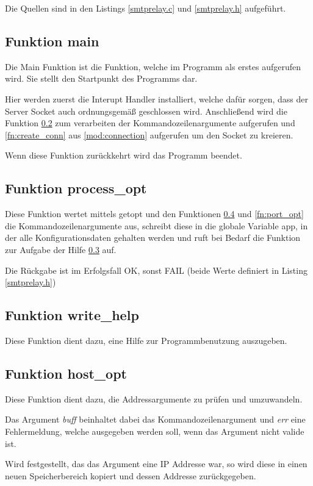 \documentclass[pdftex,final,a4paper,10pt,notitlepage,halfparskip]{scrreprt}
\begin{document}
Die Quellen sind in den Listings \ref{smtprelay.c} und \ref{smtprelay.h} aufgeführt.

\subsection{Funktion main}\label{fn:main}
Die Main Funktion ist die Funktion, welche im Programm als erstes aufgerufen wird. Sie stellt den Startpunkt des Programms dar.

Hier werden zuerst die Interupt Handler installiert, welche dafür sorgen, dass der Server Socket auch ordnungsgemäß geschlossen wird. Anschließend wird die Funktion \ref{fn:process_opt} zum verarbeiten der Kommandozeilenargumente aufgerufen und \ref{fn:create_conn} aus \ref{mod:connection} aufgerufen um den Socket zu kreieren.

Wenn diese Funktion zurückkehrt wird das Programm beendet.

\subsection{Funktion process\_opt}\label{fn:process_opt}
Diese Funktion wertet mittels getopt und den Funktionen \ref{fn:host_opt} und \ref{fn:port_opt} die Kommandozeilenargumente aus, schreibt diese in die globale Variable app, in der alle Konfigurationsdaten gehalten werden und ruft bei Bedarf die Funktion zur Aufgabe der Hilfe \ref{fn:write_help} auf.

Die Rückgabe ist im Erfolgsfall OK, sonst FAIL (beide Werte definiert in Listing \ref{smtprelay.h})

\subsection{Funktion write\_help}\label{fn:write_help}
Diese Funktion dient dazu, eine Hilfe zur Programmbenutzung auszugeben.

\subsection{Funktion host\_opt}\label{fn:host_opt}
Diese Funktion dient dazu, die Addressargumente zu prüfen und umzuwandeln.

Das Argument \textit{buff} beinhaltet dabei das Kommandozeilenargument und \textit{err} eine Fehlermeldung, welche ausgegeben werden soll, wenn das Argument nicht valide ist.

Wird festgestellt, das das Argument eine IP Addresse war, so wird diese in einen neuen Speicherbereich kopiert und dessen Addresse zurückgegeben.
\end{document}
